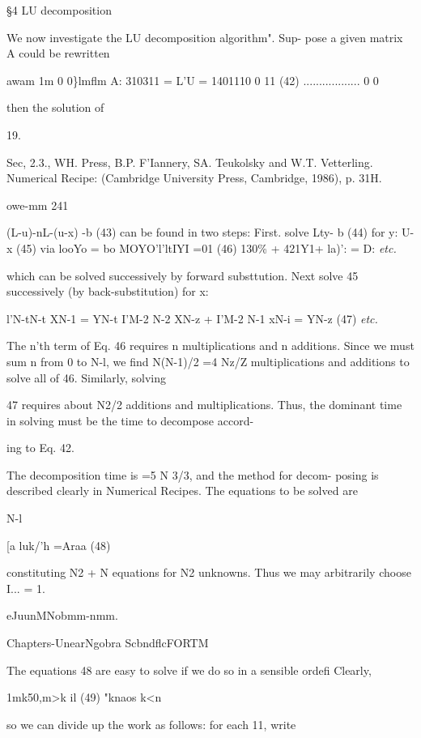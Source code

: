  

\S4 LU decomposition

We now investigate the LU decomposition algorithm". Sup-
pose a given matrix A could be rewritten

awam 1m 0 0\}lmflm
A: 310311 = L'U = 1401110 0  11 (42)
.................. 0 0

then the solution of

 

19.

Sec, 2.3., WH. Press, B.P. F'Iannery, SA. Teukolsky and W.T. Vetterling. Numerical Recipe:
(Cambridge University Press, Cambridge, 1986), p. 31H.

owe-mm 241

(L-u)-nL-(u-x) -b (43)
can be found in two steps: First. solve
Lty- b (44)
for
y: U-x (45)
via
looYo = bo
MOYO'l'ltIYI =01 (46)
130\% + 421Y1+ la)': = D:
\textit{etc.}

which can be solved successively by forward substtution. Next
solve 45 successively (by back-substitution) for x:

l'N-tN-t XN-1 = YN-t
I'M-2 N-2 XN-z + I'M-2 N-1 xN-i = YN-z (47)
\textit{etc.}

The n'th term of Eq. 46 requires n multiplications and n additions.
Since we must sum n from 0 to N-l, we find N(N-1)/2 =4 Nz/Z
multiplications and additions to solve all of 46. Similarly, solving

47 requires about N2/2 additions and multiplications. Thus, the
dominant time in solving must be the time to decompose accord-

ing to Eq. 42.

The decomposition time is =5 N 3/3, and the method for decom-
posing is described clearly in Numerical Recipes. The equations
to be solved are

N-l

[a luk/'h =Araa (48)

constituting N2 + N equations for N2 unknowns. Thus we may
arbitrarily choose I... = 1.

eJuunMNobmm-nmm.

Chapters-UnearNgobra ScbndflcFORTM

The equations 48 are easy to solve if we do so in a sensible ordefi
Clearly,

1mk50,m>k il
(49)
"knaos k<n

so we can divide up the work as follows: for each 11, write

 

 

